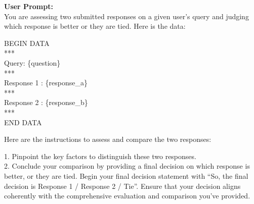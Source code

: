 \documentclass{article} %
\begin{document}
\begin{tcolorbox}[colback=gray!5!white, colframe=gray!60!black, title=Auto-J Prompt, breakable]
\textbf{User Prompt:}\\
You are assessing two submitted responses on a given user's query and judging which response is better or they are tied. Here is the data:\\\par
\lbrack BEGIN DATA\rbrack\\
***\\
\lbrack Query\rbrack : \{question\}\\
***\\
\lbrack Response 1 \rbrack: \{response\_a\}\\
***\\
\lbrack Response 2 \rbrack: \{response\_b\}\\
***\\
\lbrack END DATA\rbrack\\\par
Here are the instructions to assess and compare the two responses:\\\par
1. Pinpoint the key factors to distinguish these two responses.\\
2. Conclude your comparison by providing a final decision on which response is better, or they are tied. Begin your final decision statement with ``So, the final decision is Response 1 / Response 2 / Tie''. Ensure that your decision aligns coherently with the comprehensive evaluation and comparison you've provided.
\end{tcolorbox}
\end{document}
